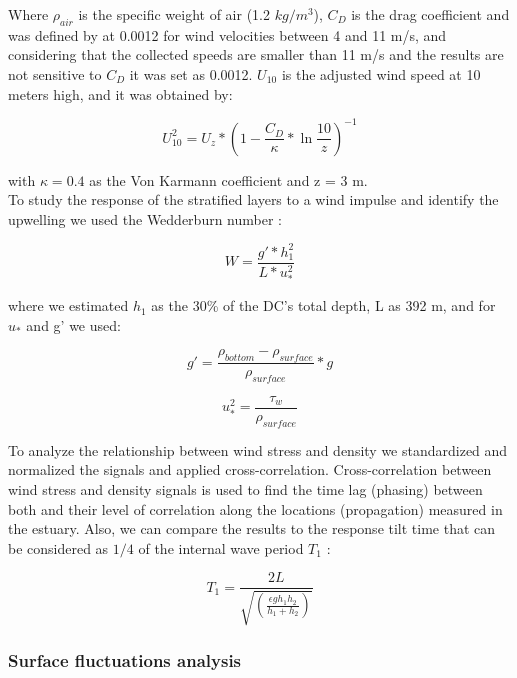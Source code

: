 \documentclass[tesis.tex]{subfiles}
\begin{document}
Where $\rho_{air}$ is the specific weight of air (1.2 $kg/m^3$), $C_D$ is the drag coefficient and was defined by \cite{large1981open} at 0.0012 for wind velocities between 4 and 11 m/s, and considering that the collected speeds are smaller than 11 m/s and the results are not sensitive to $C_D$ it was set as 0.0012. $U_{10}$ is the adjusted wind speed at 10 meters high, and it was obtained by: 

\begin{equation}
    U_{10}^2=U_z*(1-\frac{C_D}{\kappa}*\ln{\frac{10}{z}})^{-1}
    \label{eq: adjvel}
\end{equation}

with $\kappa=0.4$ as the Von Karmann coefficient and z = 3 m.\\

To study the response of the stratified layers to a wind impulse and identify the upwelling we used the Wedderburn number \citep{Shintani2010}:

\begin{equation}
    W=\frac{g'*h_1^2}{L*u_*^2}
    \label{eq: wed}
\end{equation}

where we estimated $h_1$ as the 30\% of the DC's total depth, L as 392 m, and for $u_*$ and g' we used:

\begin{equation}
    g'=\frac{\rho_{bottom}-\rho_{surface}}{\rho_{surface}}*g
    \label{eq: redg}
\end{equation}

\begin{equation}
    u_*^2=\frac{\tau_w}{\rho_{surface}}
    \label{eq: ustar}
\end{equation}


To analyze the relationship between wind stress and density we standardized and normalized the signals and applied cross-correlation. Cross-correlation between wind stress and density signals is used to find the time lag (phasing) between both and their level of correlation along the locations (propagation) measured in the estuary. Also, we can compare the results to the response tilt time that can be considered as $1/4$ of the internal wave period $T_1$ \citep{stevens1996initial}: 

\begin{equation}
    T_1=\frac{2L}{\sqrt{(\frac{\epsilon g h_1 h_2}{h_1 + h_2})}}
    \label{eq: period}
\end{equation}

\subsubsection{Surface fluctuations analysis}
\end{document}
